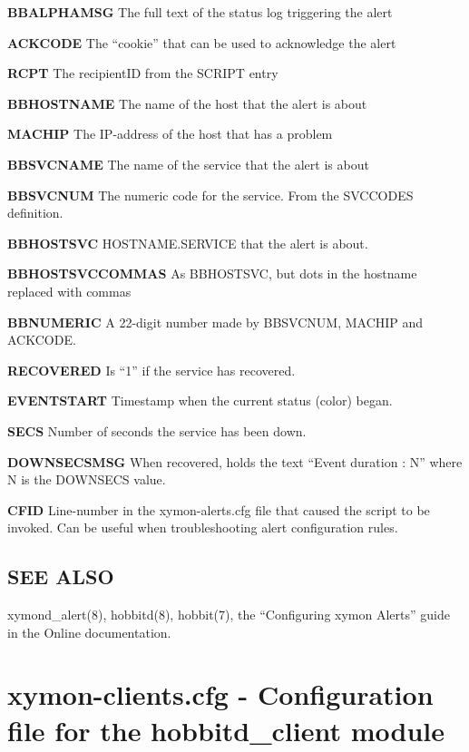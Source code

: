  \textbf{BBALPHAMSG}
 The full text of the status log triggering the alert 


 \textbf{ACKCODE}
 The ``cookie'' that can be used to acknowledge the alert 


 \textbf{RCPT}
 The recipientID from the SCRIPT entry 


 \textbf{BBHOSTNAME}
 The name of the host that the alert is about 


 \textbf{MACHIP}
 The IP-address of the host that has a problem 


 \textbf{BBSVCNAME}
 The name of the service that the alert is about 


 \textbf{BBSVCNUM}
 The numeric code for the service. From the SVCCODES definition. 


 \textbf{BBHOSTSVC}
 HOSTNAME.SERVICE that the alert is about. 


 \textbf{BBHOSTSVCCOMMAS}
 As BBHOSTSVC, but dots in the hostname replaced with commas 


 \textbf{BBNUMERIC}
 A 22-digit number made by BBSVCNUM, MACHIP and ACKCODE. 


 \textbf{RECOVERED}
 Is ``1'' if the service has recovered. 


 \textbf{EVENTSTART}
 Timestamp when the current status (color) began. 


 \textbf{SECS}
 Number of seconds the service has been down. 


 \textbf{DOWNSECSMSG}
 When recovered, holds the text ``Event duration : N'' where N is the DOWNSECS value. 


 \textbf{CFID}
 Line-number in the xymon-alerts.cfg file that caused the script to be invoked. Can be useful when troubleshooting alert configuration rules. 


 
\subsection{SEE ALSO}
xymond\_alert(8), hobbitd(8), hobbit(7), the ``Configuring xymon Alerts'' guide in the Online documentation. 

 


  

%
\newpage
\section{xymon-clients.cfg - Configuration file for the hobbitd\_client module}
 
